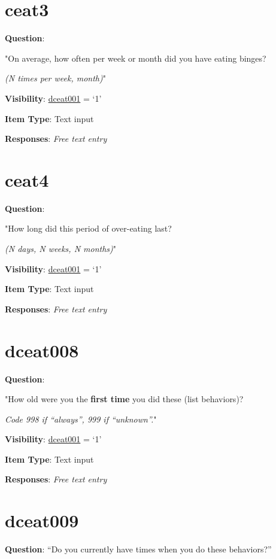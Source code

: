 \documentclass[]{book}
\begin{document}
\hypertarget{ceat3}{%
\section{ceat3}\label{ceat3}}

\textbf{Question}:

"On average, how often per week or month did you have eating binges?

\emph{(N times per week, month)}"

\textbf{Visibility}: \protect\hyperlink{dceat001}{dceat001} = `1'

\textbf{Item Type}: Text input

\textbf{Responses}: \emph{Free text entry}

\hypertarget{ceat4}{%
\section{ceat4}\label{ceat4}}

\textbf{Question}:

"How long did this period of over-eating last?

\emph{(N days, N weeks, N months)}"

\textbf{Visibility}: \protect\hyperlink{dceat001}{dceat001} = `1'

\textbf{Item Type}: Text input

\textbf{Responses}: \emph{Free text entry}

\hypertarget{dceat008}{%
\section{dceat008}\label{dceat008}}

\textbf{Question}:

"How old were you the \textbf{first time} you did these (list behaviors)?

\emph{Code 998 if ``always'', 999 if ``unknown''.}"

\textbf{Visibility}: \protect\hyperlink{dceat001}{dceat001} = `1'

\textbf{Item Type}: Text input

\textbf{Responses}: \emph{Free text entry}

\hypertarget{dceat009}{%
\section{dceat009}\label{dceat009}}

\textbf{Question}: ``Do you currently have times when you do these behaviors?''
\end{document}
